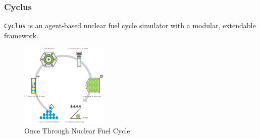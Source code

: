 \begin{frame}
    \frametitle{Cyclus}
        \texttt{Cyclus} is an agent-based nuclear fuel cycle simulator with a modular, extendable framework.
     \\   
    \begin{figure}[htbp!]
      \begin{center}
        \includegraphics[height=4cm]{../figures/nfc}
      \end{center}
            \caption{Once Through Nuclear Fuel Cycle \cite{noauthor_nuclear_nodate}}
      \label{fig:cyclus-modular}
    \end{figure}
  \end{frame}
  